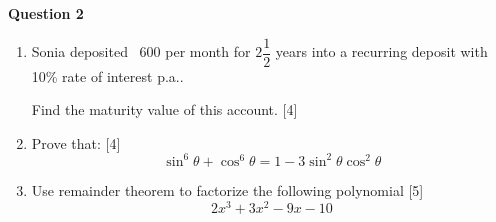 \newpage
\par
\noindent
\textbf{Question 2}\\
\begin{enumerate}[label=(\roman*)]

    \item Sonia deposited \rupee~600 per month for $2\dfrac12$ years into 
        a recurring deposit with 10\% rate of interest p.a.. 

        Find the maturity value of this account. \hfill [4]

    \item Prove that: \hfill [4]
        \[ \sin^6 \theta + \cos^6 \theta = 1 - 3 \sin^2 \theta \cos^2 \theta \]

    \item Use remainder theorem to factorize the following polynomial \hfill [5]
        \[ 2x^3 + 3x^2 - 9x - 10 \]

\end{enumerate}
